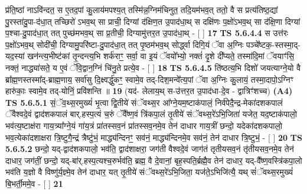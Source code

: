\documentclass[17pt]{extarticle}
\begin{document}
                  प्र॑ति॒ष्ठां नाऽवि॑न्दत॒ स ए॒तद॒पां कु॒लाय॑मपश्य॒त् तस्मि॑न्न॒ग्निम॑चिनुत॒ तदि॒यम॑भव॒त् ततो॒ वै स प्रत्य॑तिष्ठ॒द्यां पु॒रस्ता॑दु॒पा-द॑धा॒त् तच्छिरो॑ ऽभव॒थ् सा प्राची॒ दिग्यां द॑क्षिण॒त उ॒पाद॑धा॒थ् स दक्षि॑णः प॒क्षो॑ऽभव॒थ् सा द॑क्षि॒णा दिग्यां प॒श्चा-दु॒पाद॑धा॒त् तत् पुच्छ॑मभव॒थ् सा प्र॒तीची॒ दिग्यामु॑त्तर॒त उ॒पाद॑धा॒थ् - [  ] \textbf{  17 } \newline
                  \newline
                                \textbf{ TS 5.6.4.4} \newline
                  स उत्त॑रः प॒क्षो॑ऽभव॒थ् सोदी॑ची॒ दिग्यामु॒परि॑ष्टा-दु॒पाद॑धा॒त् तत् पृ॒ष्ठम॑भव॒थ् सोर्द्ध्वा दिगि॒यं ॅवा अ॒ग्निः पञ्चे᳚ष्टक॒-स्तस्मा॒द्-यद॒स्यां खन॑न्त्य॒भीष्ट॑कां तृ॒न्दन्त्य॒भि शर्क॑राꣳ॒॒ सर्वा॒ वा इ॒यं ॅवयो᳚भ्यो॒ नक्तं॑ दृ॒शे दी᳚प्यते॒ तस्मा॑दि॒मां ॅवयाꣳ॑सि॒ नक्तं॒ नाद्ध्या॑सते॒ य ए॒वं ॅवि॒द्वान॒ग्निं चि॑नु॒ते प्रत्ये॒व - [  ] \textbf{  18} \newline
                  \newline
                                \textbf{ TS 5.6.4.5} \newline
                  ति॑ष्ठत्य॒भि दिशो॑ जयत्याग्ने॒यो वै ब्रा᳚ह्म॒णस्तस्मा᳚द्-ब्राह्म॒णाय॒ सर्वा॑सु दि॒क्ष्वर्द्धु॑कꣳ॒॒ स्वामे॒व तद्-दिश॒मन्वे᳚त्य॒पां ॅवा अ॒ग्निः कु॒लायं॒ तस्मा॒दापो॒ऽग्निꣳ हारु॑काः॒ स्वामे॒व तद्-योनिं॒ प्रवि॑शन्ति ॥ \textbf{  19} \newline
                  \newline
                      (यद॑- लेलाय॒थ् स-उ॑त्तर॒त उ॒पाद॑धा-दे॒व - द्वात्रिꣳ॑शच्च)  \textbf{(A4)} \newline \newline
                                        \textbf{ TS 5.6.5.1} \newline
                  सं॒ॅव॒थ्स॒रमुख्यं॑ भृ॒त्वा द्वि॒तीये॑ संॅवथ्स॒र आ᳚ग्ने॒यम॒ष्टाक॑पालं॒ निर्व॑पेदै॒न्द्र-मेका॑दशकपालं ॅवैश्वदे॒वं द्वाद॑शकपालं बार्.हस्प॒त्यं च॒रुं ॅवै᳚ष्ण॒वं त्रि॑कपा॒लं तृ॒तीये॑ संॅवथ्स॒रे॑ऽभि॒जिता॑ यजेत॒ यद॒ष्टाक॑पालो॒ भव॑त्य॒ष्टाक्ष॑रा गाय॒त्र्या᳚ग्ने॒यं गा॑य॒त्रं प्रा॑तस्सव॒नं प्रा॑तस्सव॒नमे॒व तेन॑ दाधार गाय॒त्रीं छन्दो॒ यदेका॑दशकपालो॒ भव॒त्येका॑दशाक्षरा त्रि॒ष्टुगै॒न्द्रं त्रैष्टु॑भं॒ माद्ध्य॑न्दिनꣳ॒॒ सव॑नं॒ माद्ध्य॑न्दिनमे॒व सव॑नं॒ तेन॑ दाधार त्रि॒ष्टुभं॒ - [  ] \textbf{  20} \newline
                  \newline
                                \textbf{ TS 5.6.5.2} \newline
                  छन्दो॒ यद्-द्वाद॑शकपालो॒ भव॑ति॒ द्वाद॑शाक्षरा॒ जग॑ती वैश्वदे॒वं जाग॑तं तृतीयसव॒नं तृ॑तीयसव॒नमे॒व तेन॑ दाधार॒ जग॑तीं॒ छन्दो॒ यद्-बा॑र्.हस्प॒त्यश्च॒रुर्भव॑ति॒ ब्रह्म॒ वै दे॒वानां॒ बृह॒स्पति॒र्ब्रह्मै॒व तेन॑ दाधार॒ यद्-वै᳚ष्ण॒वस्त्रि॑कपा॒लो भव॑ति य॒ज्ञो वै विष्णु॑र्य॒ज्ञ्मे॒व तेन॑ दाधार॒ यत् तृ॒तीये॑ संॅवथ्स॒रे॑ऽभि॒जिता॒ यज॑ते॒ऽभिजि॑त्यै॒ यथ् सं॑ॅवथ्स॒रमुख्यं॑ बि॒भर्ती॒ममे॒व - [  ] \textbf{  21} \newline
\end{document}
